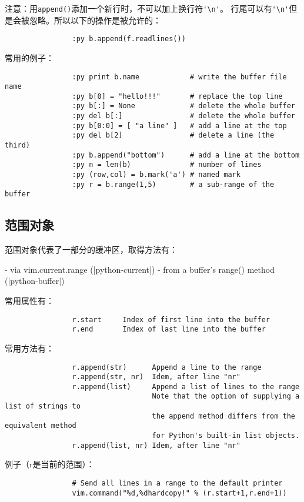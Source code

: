 			注意：用\verb|append()|添加一个新行时，不可以加上换行符\verb|'\n'|。 行尾可以有\verb|'\n'|但是会被忽略。所以以下的操作是被允许的：
			\begin{verbatim}
				:py b.append(f.readlines())
			\end{verbatim}

			常用的例子：

			\begin{verbatim}
				:py print b.name            # write the buffer file name
				:py b[0] = "hello!!!"       # replace the top line
				:py b[:] = None             # delete the whole buffer
				:py del b[:]                # delete the whole buffer
				:py b[0:0] = [ "a line" ]   # add a line at the top
				:py del b[2]                # delete a line (the third)
				:py b.append("bottom")      # add a line at the bottom
				:py n = len(b)              # number of lines
				:py (row,col) = b.mark('a') # named mark
				:py r = b.range(1,5)        # a sub-range of the buffer
			\end{verbatim}

		\subsection{范围对象}

			范围对象代表了一部分的缓冲区，取得方法有：

				- via vim.current.range (|python-current|)
				- from a buffer's range() method (|python-buffer|)

			常用属性有：
			\begin{verbatim}
				r.start     Index of first line into the buffer
				r.end       Index of last line into the buffer
			\end{verbatim}

			常用方法有：
			\begin{verbatim}
				r.append(str)      Append a line to the range
				r.append(str, nr)  Idem, after line "nr"
				r.append(list)     Append a list of lines to the range
				                   Note that the option of supplying a list of strings to
				                   the append method differs from the equivalent method
				                   for Python's built-in list objects.
				r.append(list, nr) Idem, after line "nr"
			\end{verbatim}

			例子（r是当前的范围）：
			\begin{verbatim}
				# Send all lines in a range to the default printer
				vim.command("%d,%dhardcopy!" % (r.start+1,r.end+1))
			\end{verbatim}

